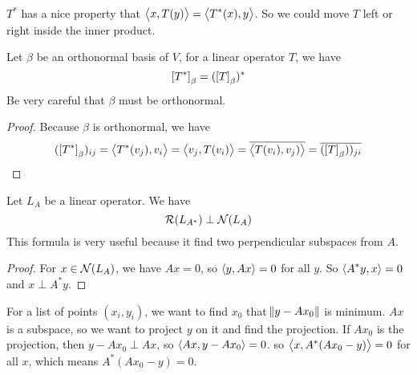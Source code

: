$T^*$ has a nice property that $\left\langle \displaystyle x, T(y) \right\rangle = \left\langle \displaystyle T^* (x), y \right\rangle$. So we could move $T$ left or right inside the inner product.

\begin{theorem}\label{operator_conjugate_transpose_requirement}
    Let $\beta$ be an orthonormal basis of $V$, for a linear operator $T$, we have
    \begin{equation}
        \coordinate{T^*}_\beta = (\coordinate{T}_\beta)^*
    \end{equation}
    Be very careful that $\beta$ must be orthonormal.
\end{theorem}
\begin{proof}
    Because $\beta$ is orthonormal, we have
    \begin{equation*}
        (\coordinate{T^*}_\beta)_{ij} = \innerproduct{T^* (v_j)}{v_i} = \innerproduct{v_j}{T(v_i)} = \conjugate{\innerproduct{T(v_i)}{v_j)}} = \conjugate{(\coordinate{T}_\beta))_{ji}}
    \end{equation*}
\end{proof}

\begin{theorem}
    Let $L_A$ be a linear operator. We have
    \begin{equation}
        \mathcal{R}(L_{A^*}) \perp \mathcal{N}(L_A)
    \end{equation}
    This formula is very useful because it find two perpendicular subspaces from $A$.
\end{theorem}
\begin{proof}
    For $x \in \mathcal{N}(L_A)$, we have $Ax = 0$, so $\left\langle \displaystyle y, Ax \right\rangle = 0$ for all $y$. So $\left\langle \displaystyle A^* y, x \right\rangle = 0$ and $x \perp A^*y$.
\end{proof}



\begin{example}
    For a list of points $(x_i, y_i)$, we want to find $x_0$ that $\norm{y - Ax_0}$ is minimum. $Ax$ is a subspace, so we want to project $y$ on it and find the projection. If $Ax_0$ is the projection, then $y - Ax_0 \perp Ax$, so $\left\langle \displaystyle Ax, y - Ax_0 \right\rangle = 0$. so $\left\langle \displaystyle x, A^* (Ax_0 - y) \right\rangle = 0$ for all $x$, which means $A^* (Ax_0 - y) = 0$.
\end{example}

